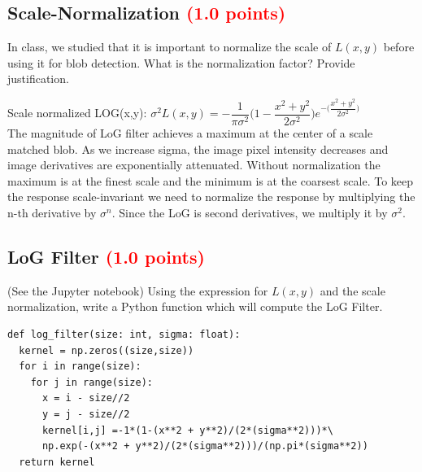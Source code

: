 \documentclass[answers]{exam}
\newcommand{\mypoints}[1]{\textcolor{red}{(#1 points)}}
\begin{document}
\subsection{Scale-Normalization \mypoints{1.0}}
In class, we studied that it is important to normalize the scale of $L(x,y)$ before using it for blob detection. What is the normalization factor? Provide justification.
\begin{solution}
Scale normalized LOG(x,y): $\sigma^2 L(x,y) = -\dfrac{1}{\pi \sigma^2}\big(1 - \dfrac{x^2 + y^2}{2\sigma^2}\big) e^{-\big(\dfrac{x^2+y^2}{2\sigma^2}\big)} $\\

The magnitude of LoG filter achieves a maximum at the center of a scale matched blob. As we increase sigma, the image pixel intensity decreases and image derivatives are exponentially attenuated. Without normalization the maximum is at the finest scale and the minimum is at the coarsest scale. To keep the response scale-invariant we need to normalize the response by multiplying the n-th derivative by $\sigma^n$. Since the LoG is second derivatives, we multiply it by $\sigma^2$. 

\end{solution}

\subsection{LoG Filter \mypoints{1.0}}
(See the Jupyter notebook) Using the expression for $L(x,y)$ and the scale normalization, write a Python function which will compute the LoG Filter.
\begin{solution}
\begin{verbatim}
def log_filter(size: int, sigma: float):
  kernel = np.zeros((size,size))
  for i in range(size):
    for j in range(size):
      x = i - size//2
      y = j - size//2
      kernel[i,j] =-1*(1-(x**2 + y**2)/(2*(sigma**2)))*\
      np.exp(-(x**2 + y**2)/(2*(sigma**2)))/(np.pi*(sigma**2))
  return kernel
\end{verbatim}
\end{solution}
\end{document}
